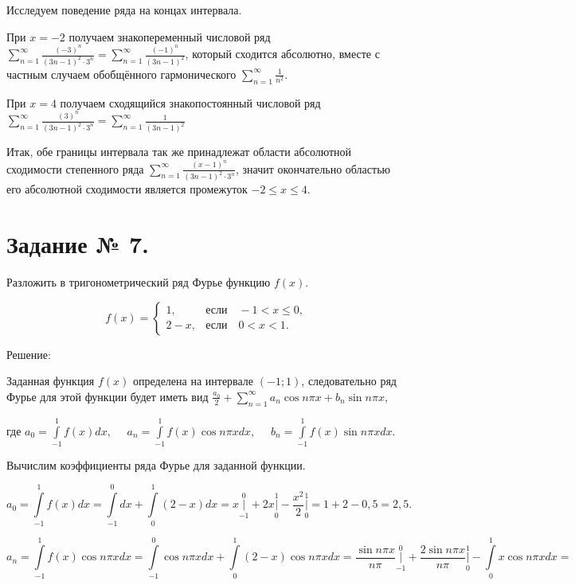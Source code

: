 \documentclass{article}
\renewcommand{\leq}{\ensuremath{\leqslant}}
\begin{document}
Исследуем поведение ряда на концах интервала.

При $x=-2$ получаем знакопеременный числовой ряд $\sum\limits_{n=1}^{\infty}\frac{(-3)^n}{(3n-1)^2\cdot3^n}=\sum\limits_{n=1}^{\infty}\frac{(-1)^n}{(3n-1)^2}$, который сходится абсолютно, вместе с частным случаем обобщённого гармонического $\sum\limits_{n=1}^{\infty}\frac{1}{n^2}$.

При $x=4$ получаем сходящийся знакопостоянный числовой ряд
$\sum\limits_{n=1}^{\infty}\frac{(3)^n}{(3n-1)^2\cdot3^n}=\sum\limits_{n=1}^{\infty}\frac{1}{(3n-1)^2}$

Итак, обе границы интервала так же принадлежат области абсолютной сходимости степенного ряда $\sum\limits_{n=1}^{\infty}\frac{(x-1)^n}{(3n-1)^2\cdot3^n}$, значит окончательно областью его абсолютной сходимости является промежуток $-2\leq x\leq4$.

\section*{Задание № 7.}

Разложить в тригонометрический ряд Фурье функцию $f(x)$.

\begin{equation*}
f(x)=
 \begin{cases}
  1, & \textit{если}\quad -1<x\leq0,\\
  2-x, & \textit{если}\quad 0<x<1.
 \end{cases}
\end{equation*}

\begin{center}Решение:\end{center}

Заданная функция $f(x)$ определена на интервале $(-1;1)$, следовательно ряд Фурье для этой функции будет иметь вид $\frac{a_0}{2}+\sum\limits_{n=1}^{\infty}a_n \cos{n\pi x}+b_n \sin{n\pi x}$,


где $a_0=\int\limits_{-1}^{1}f(x)dx,\quad$ $a_n=\int\limits_{-1}^{1}f(x)\cos{n\pi x}dx,\quad$ $b_n=\int\limits_{-1}^{1}f(x)\sin{n\pi x}dx$.

Вычислим коэффициенты ряда Фурье для заданной функции.

$$a_0=\int\limits_{-1}^{1}f(x)dx=\int\limits_{-1}^{0}dx+\int\limits_{0}^{1}(2-x)dx=x\bigg|\limits_{-1}^{0}+2x\bigg|\limits_{0}^{1}-\frac{x^2}{2}\bigg|\limits_{0}^{1}=1+2-0,5=2,5.$$

$$a_n=\int\limits_{-1}^{1}f(x)\cos{n\pi x}dx=\int\limits_{-1}^{0}\cos{n\pi x}dx+\int\limits_{0}^{1}(2-x)\cos{n\pi x}dx=\frac{\sin{n\pi x}}{n\pi}\bigg|\limits_{-1}^{0}+\frac{2\sin{n\pi x}}{n\pi}\bigg|\limits_{0}^{1}-\int\limits_{0}^{1}x\cos{n\pi x}dx=$$
\end{document}
